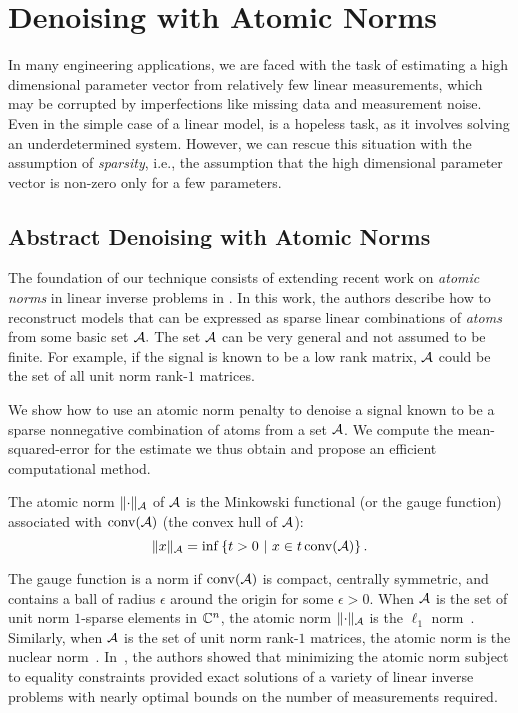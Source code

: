 \chapter{Denoising with Atomic Norms}

In many engineering applications, we are faced with the task of estimating
a high dimensional parameter vector from relatively few linear measurements,
which may be corrupted by imperfections like missing data and measurement noise.
Even in the simple case of a linear model,  is a hopeless task, as it involves solving an underdetermined system. However, we can rescue this situation with the assumption of \emph{sparsity}, i.e., the assumption that the high dimensional parameter vector is non-zero only for a few parameters. 

\section{Abstract Denoising with Atomic Norms}
\label{sec:abstract-denoising}

The foundation of our technique consists of extending recent work
on \emph{atomic norms} in linear inverse problems in \cite{crpw}. In this work,
the authors describe how to reconstruct models that can be expressed as sparse
linear combinations of \emph{atoms} from some basic set $\mathcal{A}.$ The set $\mathcal{A}$ can
be very general and not assumed to be finite. For example, if the signal is
known to be a low rank matrix, $\mathcal{A}$ could be the set of all unit norm rank-$1$ matrices.

We show how to use an atomic norm penalty to denoise a signal known to be a
sparse nonnegative combination of atoms from a set $\mathcal{A}$. We compute the mean-squared-error for
the estimate we thus obtain and propose an efficient computational method.

\begin{definition}

The atomic norm $\lVert\cdot\rVert_{\mathcal{A}}$ of $\mathcal{A}$ is the Minkowski functional (or the
gauge function) associated with $\operatorname{conv}(\mathcal{A})$ (the convex hull of $\mathcal{A}$):
\begin{equation}
	\label{defatnorm} \lVert x\rVert_{\mathcal{A}} = \inf\left\{t > 0 ~\middle|~ x \in t \operatorname{conv}(\mathcal{A}) \right\}. 
\end{equation}
\end{definition}

The gauge function is a norm if $\operatorname{conv}(\mathcal{A})$ is compact, centrally symmetric,
and contains a ball of radius $\epsilon$ around the origin for some
$\epsilon>0$. When $\mathcal{A}$ is the set of unit norm
$1$-sparse elements in $\mathbb{C}^n$, the atomic norm $\lVert\cdot\rVert_{\mathcal{A}}$ is the
$\ell_1$ norm~\cite{candes06}. Similarly, when $\mathcal{A}$ is the set of unit norm
rank-$1$ matrices, the atomic norm is the nuclear norm~\cite{Recht10}.
In~\cite{crpw}, the authors showed that minimizing the atomic norm subject to
equality constraints provided exact solutions of a variety of linear inverse
problems with nearly optimal bounds on the number of measurements required.

